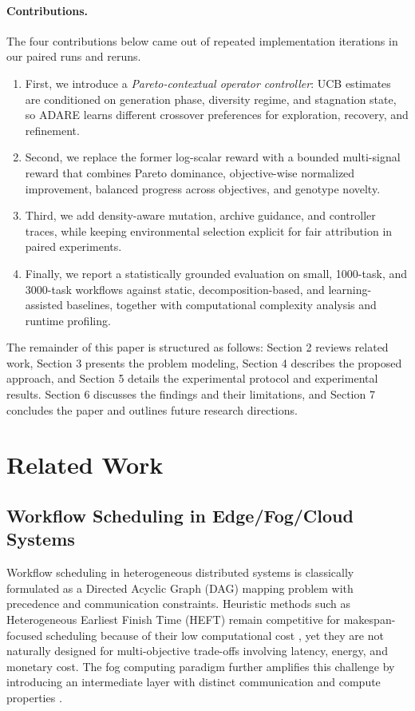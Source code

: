 \documentclass[runningheads]{llncs}
\begin{document}
\paragraph{Contributions.}
The four contributions below came out of repeated implementation iterations in our paired runs and reruns.
\begin{enumerate}
    \item First, we introduce a \emph{Pareto-contextual operator controller}: UCB estimates are conditioned on generation phase, diversity regime, and stagnation state, so ADARE learns different crossover preferences for exploration, recovery, and refinement.
    \item Second, we replace the former log-scalar reward with a bounded multi-signal reward that combines Pareto dominance, objective-wise normalized improvement, balanced progress across objectives, and genotype novelty.
    \item Third, we add density-aware mutation, archive guidance, and controller traces, while keeping environmental selection explicit for fair attribution in paired experiments.
    \item Finally, we report a statistically grounded evaluation on small, 1000-task, and 3000-task workflows against static, decomposition-based, and learning-assisted baselines, together with computational complexity analysis and runtime profiling.
\end{enumerate}

The remainder of this paper is structured as follows: Section 2 reviews related work, Section 3 presents the problem modeling, Section 4 describes the proposed approach, and Section 5 details the experimental protocol and experimental results. Section 6 discusses the findings and their limitations, and Section 7 concludes the paper and outlines future research directions.

\section{Related Work}
\subsection{Workflow Scheduling in Edge/Fog/Cloud Systems}
Workflow scheduling in heterogeneous distributed systems is classically formulated as a Directed Acyclic Graph (DAG) mapping problem with precedence and communication constraints. Heuristic methods such as Heterogeneous Earliest Finish Time (HEFT) remain competitive for makespan-focused scheduling because of their low computational cost \cite{topcuoglu2002heft}, yet they are not naturally designed for multi-objective trade-offs involving latency, energy, and monetary cost. The fog computing paradigm further amplifies this challenge by introducing an intermediate layer with distinct communication and compute properties \cite{bonomi2012fog}.
\end{document}
